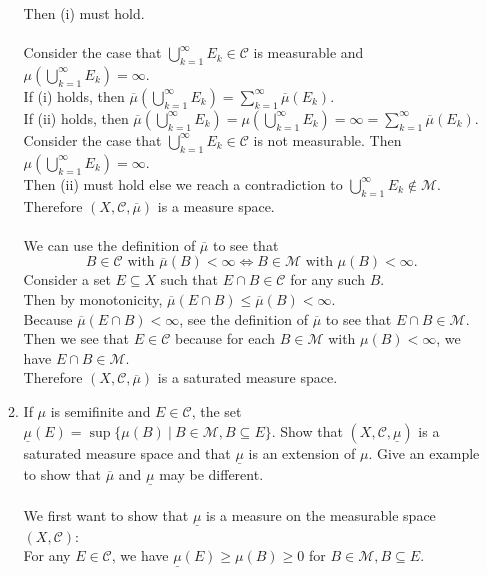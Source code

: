 \begin{enumerate}
\begin{enumerate}[label=(\roman*),align=left]
		Then (i) must hold.\\
		\\Consider the case that $\bigcup_{k=1}^\infty E_k\in\mathcal{C}$ is measurable and $\mu(\bigcup_{k=1}^\infty E_k)=\infty$. \\
		If (i) holds, then $\overline\mu(\bigcup_{k=1}^\infty E_k)=\sum_{k=1}^\infty\overline\mu(E_k)$.\\
		If (ii) holds, then $\overline\mu(\bigcup_{k=1}^\infty E_k)=\mu(\bigcup_{k=1}^\infty E_k)=\infty=\sum_{k=1}^\infty \overline\mu(E_k)$.\\\bigskip
		Consider the case that $\bigcup_{k=1}^\infty E_k\in\mathcal{C}$ is not measurable. Then $\mu(\bigcup_{k=1}^\infty E_k)=\infty$. \\
		Then (ii) must hold else we reach a contradiction to $\bigcup_{k=1}^\infty E_k\notin\mathcal{M}$.\\\bigskip
		Therefore $(X,\mathcal{C},\overline\mu)$ is a measure space.\\
		\\We can use the definition of $\overline\mu$ to see that 
		\[
			B\in\mathcal{C}\text{ with }\overline\mu(B)<\infty\iff B\in\mathcal{M}\text{ with }\mu(B)<\infty.
		\]
		Consider a set $E\subseteq X$ such that $E\cap B\in\mathcal{C}$ for any such $B$.
		\\Then by monotonicity, $\overline\mu(E\cap B)\le \overline\mu(B)<\infty$.
		\\Because $\overline\mu(E\cap B)<\infty$, see the definition of $\overline\mu$ to see that $E\cap B\in\mathcal{M}$.
		\\Then we see that $E\in\mathcal{C}$ because for each $B\in\mathcal{M}$ with $\mu(B)<\infty$, we have $E\cap B\in\mathcal{M}$.\\\bigskip
		Therefore $(X,\mathcal{C},\overline\mu)$ is a saturated measure space.
		\item If $\mu$ is semifinite and $E\in\mathcal{C}$, the set $\underline\mu(E)=\sup\{\mu(B)\ |\ B\in\mathcal{M},B\subseteq E\}$.
		Show that $(X,\mathcal{C},\underline\mu)$ is a saturated measure space and that $\underline\mu$ is an extension of $\mu$.
		Give an example to show that $\overline\mu$ and $\underline\mu$ may be different.\\
		\\We first want to show that $\underline\mu$ is a measure on the measurable space $(X,\mathcal{C})$:
		\\For any $E\in\mathcal{C}$, we have $\underline\mu(E)\ge\mu(B)\ge0$ for $B\in\mathcal{M},B\subseteq E$.

\end{enumerate}
\end{enumerate}
